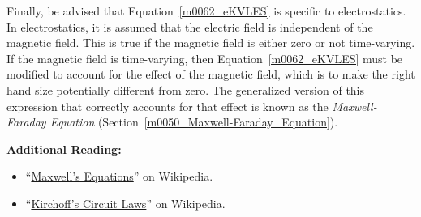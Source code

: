 Finally, be advised that Equation~\ref{m0062_eKVLES} is specific to electrostatics.  In electrostatics, it is assumed that the electric field is independent of the magnetic field.
This is true if the magnetic field is either zero or not time-varying.  If the magnetic field is time-varying, then Equation~\ref{m0062_eKVLES} must be modified to account for the effect of the magnetic field, which is to make the right hand size potentially different from zero.  The generalized version of this expression that correctly accounts for that effect is known as the \emph{Maxwell-Faraday Equation} (Section~\ref{m0050_Maxwell-Faraday_Equation}).


{\bf Additional Reading:}
\begin{itemize}
\item ``\href{https://en.wikipedia.org/wiki/Maxwell's_equations}{Maxwell's Equations}'' on Wikipedia.
\item ``\href{https://en.wikipedia.org/wiki/Kirchhoff's_circuit_laws}{Kirchoff's Circuit Laws}'' on Wikipedia.
\end{itemize}



